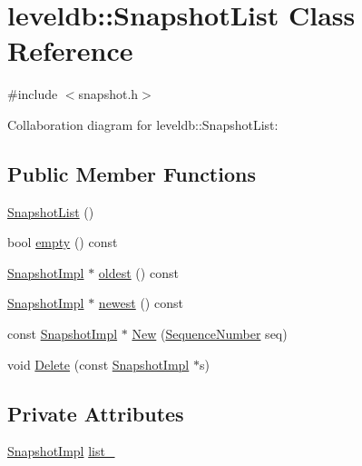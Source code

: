 \hypertarget{classleveldb_1_1_snapshot_list}{\section{leveldb\-:\-:Snapshot\-List Class Reference}
\label{classleveldb_1_1_snapshot_list}
}


{\ttfamily \#include $<$snapshot.\-h$>$}



Collaboration diagram for leveldb\-:\-:Snapshot\-List\-:
\subsection*{Public Member Functions}
\begin{DoxyCompactItemize}
\item 
\hyperlink{classleveldb_1_1_snapshot_list_a8e312959c2c2e2e64e9bb7eaca2459ae}{Snapshot\-List} ()
\item 
bool \hyperlink{classleveldb_1_1_snapshot_list_a27da501f33ea4aff4bb13c3443f98f70}{empty} () const 
\item 
\hyperlink{classleveldb_1_1_snapshot_impl}{Snapshot\-Impl} $\ast$ \hyperlink{classleveldb_1_1_snapshot_list_ad5990de13c4afa6877f8f3c641d8e72d}{oldest} () const 
\item 
\hyperlink{classleveldb_1_1_snapshot_impl}{Snapshot\-Impl} $\ast$ \hyperlink{classleveldb_1_1_snapshot_list_a783918fabc82113d6ffb014ce67395dc}{newest} () const 
\item 
const \hyperlink{classleveldb_1_1_snapshot_impl}{Snapshot\-Impl} $\ast$ \hyperlink{classleveldb_1_1_snapshot_list_adfd5d9c7cb888e711d83a48299141994}{New} (\hyperlink{namespaceleveldb_a5481ededd221c36d652c371249f869fa}{Sequence\-Number} seq)
\item 
void \hyperlink{classleveldb_1_1_snapshot_list_aa16863f35b8bb6dbc44f4528fab6790a}{Delete} (const \hyperlink{classleveldb_1_1_snapshot_impl}{Snapshot\-Impl} $\ast$s)
\end{DoxyCompactItemize}
\subsection*{Private Attributes}
\begin{DoxyCompactItemize}
\item 
\hyperlink{classleveldb_1_1_snapshot_impl}{Snapshot\-Impl} \hyperlink{classleveldb_1_1_snapshot_list_a7c45d05759fcc3853c140816da181b0c}{list\-\_\-}
\end{DoxyCompactItemize}


